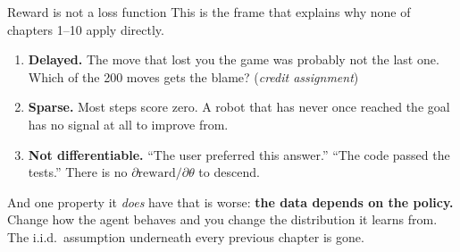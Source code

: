 \documentclass[aspectratio=169]{beamer}
\begin{document}
\begin{frame}{Reward is not a loss function}
  This is the frame that explains why none of chapters 1--10 apply directly.

  \vskip 6pt
  \begin{tcolorbox}[colback=armred!8, colframe=armred, boxrule=0.6pt, arc=2pt,
                    title=\textbf{Three properties a loss does not have}]
    \small
    \begin{enumerate}\itemsep3pt
      \item \textbf{Delayed.} The move that lost you the game was probably not the last one.
            Which of the 200 moves gets the blame? (\emph{credit assignment})
      \item \textbf{Sparse.} Most steps score zero. A robot that has never once reached the
            goal has no signal at all to improve from.
      \item \textbf{Not differentiable.} ``The user preferred this answer.'' ``The code passed
            the tests.'' There is no $\partial \text{reward} / \partial \theta$ to descend.
    \end{enumerate}
  \end{tcolorbox}

  \vskip 6pt
  \begin{tcolorbox}[colback=paramgreen!8, colframe=paramgreen, boxrule=0.6pt, arc=2pt]
    \small
    And one property it \emph{does} have that is worse: \textbf{the data depends on the policy.}
    Change how the agent behaves and you change the distribution it learns from. The i.i.d.\
    assumption underneath every previous chapter is gone.
  \end{tcolorbox}
\end{frame}
\end{document}
